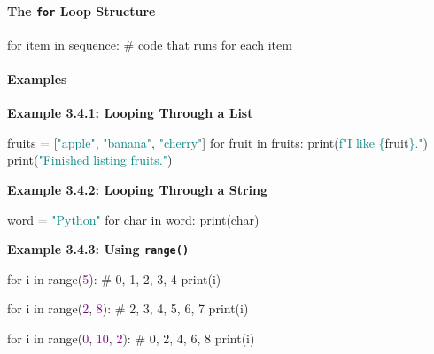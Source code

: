 \documentclass[
  justified,
  openright,
]{tufte-book}
\let\subsubsection\paragraph
\let\paragraph\paragraph
\newcommand{\BuiltInTok}[1]{#1}
\newcommand{\CommentTok}[1]{\textcolor{MidGray}{#1}}
\newcommand{\ControlFlowTok}[1]{\textcolor{BrandBlue}{#1}}
\newcommand{\DecValTok}[1]{\textcolor{Purple}{#1}}
\newcommand{\KeywordTok}[1]{\textcolor{BrandBlue}{#1}}
\newcommand{\NormalTok}[1]{#1}
\newcommand{\OperatorTok}[1]{\textcolor{DarkGray}{#1}}
\newcommand{\SpecialCharTok}[1]{\textcolor{Teal}{#1}}
\newcommand{\SpecialStringTok}[1]{\textcolor{Teal}{#1}}
\newcommand{\StringTok}[1]{\textcolor{Teal}{#1}}
\newenvironment{Shaded}{%
  \begin{snugshade}
}{%
  \end{snugshade}
}
\let\subsubsection\paragraph
\let\paragraph\paragraph
\begin{document}
\subsubsection{\texorpdfstring{The \texttt{for} Loop
Structure}{The for Loop Structure}}\label{the-for-loop-structure}

\begin{Shaded}
\begin{Highlighting}[]
\ControlFlowTok{for}\NormalTok{ item }\KeywordTok{in}\NormalTok{ sequence:}
    \CommentTok{\# code that runs for each item}
\end{Highlighting}
\end{Shaded}

\subsubsection{Examples}\label{examples-8}

\textbf{Example 3.4.1: Looping Through a List}

\begin{Shaded}
\begin{Highlighting}[]
\NormalTok{fruits }\OperatorTok{=}\NormalTok{ [}\StringTok{"apple"}\NormalTok{, }\StringTok{"banana"}\NormalTok{, }\StringTok{"cherry"}\NormalTok{]}
\ControlFlowTok{for}\NormalTok{ fruit }\KeywordTok{in}\NormalTok{ fruits:}
    \BuiltInTok{print}\NormalTok{(}\SpecialStringTok{f"I like }\SpecialCharTok{\{}\NormalTok{fruit}\SpecialCharTok{\}}\SpecialStringTok{."}\NormalTok{)}
\BuiltInTok{print}\NormalTok{(}\StringTok{"Finished listing fruits."}\NormalTok{)}
\end{Highlighting}
\end{Shaded}

\textbf{Example 3.4.2: Looping Through a String}

\begin{Shaded}
\begin{Highlighting}[]
\NormalTok{word }\OperatorTok{=} \StringTok{"Python"}
\ControlFlowTok{for}\NormalTok{ char }\KeywordTok{in}\NormalTok{ word:}
    \BuiltInTok{print}\NormalTok{(char)}
\end{Highlighting}
\end{Shaded}

\textbf{Example 3.4.3: Using \texttt{range()}}

\begin{Shaded}
\begin{Highlighting}[]
\ControlFlowTok{for}\NormalTok{ i }\KeywordTok{in} \BuiltInTok{range}\NormalTok{(}\DecValTok{5}\NormalTok{):      }\CommentTok{\# 0, 1, 2, 3, 4}
    \BuiltInTok{print}\NormalTok{(i)}

\ControlFlowTok{for}\NormalTok{ i }\KeywordTok{in} \BuiltInTok{range}\NormalTok{(}\DecValTok{2}\NormalTok{, }\DecValTok{8}\NormalTok{):   }\CommentTok{\# 2, 3, 4, 5, 6, 7}
    \BuiltInTok{print}\NormalTok{(i)}

\ControlFlowTok{for}\NormalTok{ i }\KeywordTok{in} \BuiltInTok{range}\NormalTok{(}\DecValTok{0}\NormalTok{, }\DecValTok{10}\NormalTok{, }\DecValTok{2}\NormalTok{):  }\CommentTok{\# 0, 2, 4, 6, 8}
    \BuiltInTok{print}\NormalTok{(i)}
\end{Highlighting}
\end{Shaded}
\end{document}
